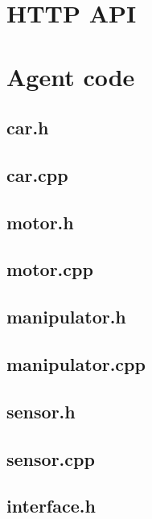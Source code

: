 \documentclass{book}
\begin{document}
\chapter{HTTP API}



\chapter{Agent code}

\section{car.h}

\section{car.cpp}


\section{motor.h}

\section{motor.cpp}


\section{manipulator.h}

\section{manipulator.cpp}


\section{sensor.h}

\section{sensor.cpp}


\section{interface.h}

\end{document}
